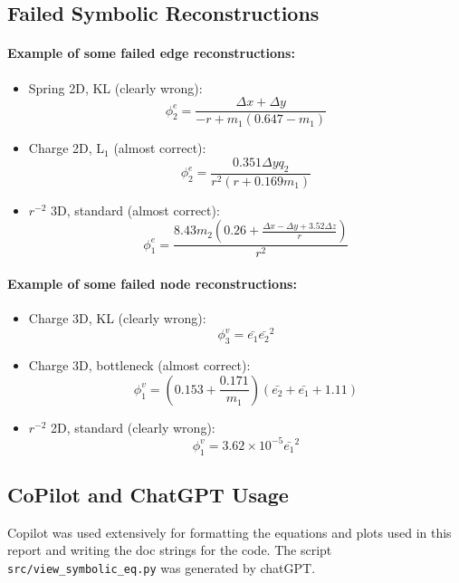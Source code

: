 \documentclass[11pt]{article}
\begin{document}
\subsection{Failed Symbolic Reconstructions}
\paragraph*{Example of some failed edge reconstructions:}
\begin{itemize}
    \item 

    Spring 2D, KL (clearly wrong):
    $$
    \phi^{e}_2 = \frac{\Delta x + \Delta y}{-r + m_1 ( 0.647 - m_1)}
    $$
    \item
    Charge 2D, L$_1$ (almost correct):
    $$
    \phi^{e}_2 = \frac{0.351\Delta y q_2}{r^2(r+0.169m_1)}
    $$
    \item
    $r^{-2}$ 3D, standard (almost correct):
    $$
    \phi^{e}_1 = \frac{8.43m_2(0.26+\frac{\Delta x - \Delta y + 3.52\Delta z}{r})}{r^2}
    $$
\end{itemize}
\paragraph{Example of some failed node reconstructions:}
\begin{itemize}
    \item 
    Charge 3D, KL (clearly wrong):
    $$
    \phi^{v}_3 = \bar{e_1}\bar{e_2}^2
    $$
    \item
    Charge 3D, bottleneck (almost correct):
    $$
    \phi^{v}_1 = (0.153 + \frac{0.171}{m_1})(\bar{e_2} + \bar{e_1} + 1.11)
    $$
    \item
    $r^{-2}$ 2D, standard (clearly wrong):
    $$
    \phi^{v}_1 = 3.62 \times 10^{-5} \bar{e_1}^2
    $$
\end{itemize}

\subsection{CoPilot and ChatGPT Usage}
Copilot was used extensively for formatting the equations and plots used in this report and writing the doc strings for the code. The script \texttt{src/view\_symbolic\_eq.py} was generated by chatGPT.



    

  
\end{document}
